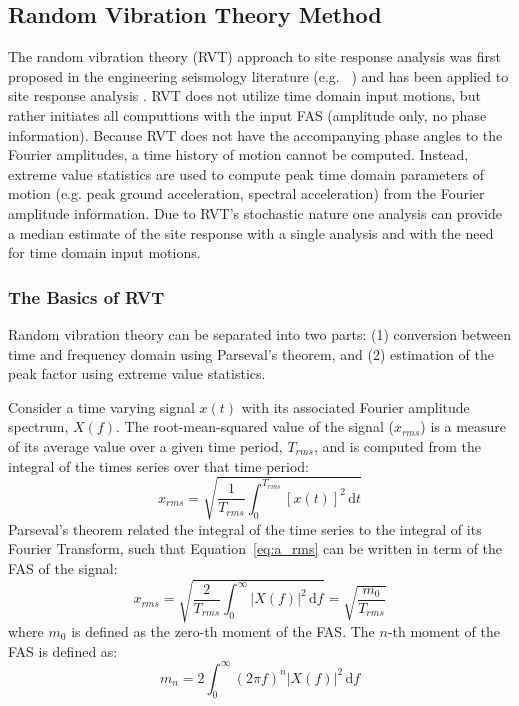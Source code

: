 \documentclass[12pt,oneside]{book}
\newcommand{\ud}{\,\mathrm{d}}
\begin{document}
\subsection{Random Vibration Theory Method}\label{ch:sra:methods:rvt}
The random vibration theory (RVT) approach to site response analysis was first proposed in the
engineering seismology literature (e.g. ~\citet{schneider:91}) and has been applied to site response
analysis \citep{silva:97,rathje:05}. RVT does not utilize time domain input motions, but rather
initiates all computtions with the input FAS (amplitude only, no phase information).  Because RVT
does not have the accompanying phase angles to the Fourier amplitudes, a time history of motion
cannot be computed.  Instead, extreme value statistics are used to compute peak time domain
parameters of motion (e.g. peak ground acceleration, spectral acceleration) from the Fourier
amplitude information. Due to RVT's stochastic nature one analysis can provide a median estimate of
the site response with a single analysis and with the need for time domain input motions.

\subsubsection{The Basics of RVT}
Random vibration theory can be separated into two parts: (1) conversion between time and frequency
domain using Parseval's theorem, and (2) estimation of the peak factor using extreme value
statistics.

Consider a time varying signal $x(t)$ with its associated Fourier amplitude spectrum, $X(f)$.  The
root-mean-squared value of the signal ($x_{rms}$) is a measure of its average value over a given
time period, $T_{rms}$, and is computed from the integral of the times series over that time period:
\begin{equation}
    x_{rms} = \sqrt{ \frac{1}{T_{rms}} \int_0^{T_{rms}} \left[ x(t) \right]^2 \ud t }
    \label{eq:a_rms}
\end{equation}
Parseval's theorem related the integral of the time series to the integral of its Fourier Transform,
such that Equation~\ref{eq:a_rms} can be written in term of the FAS of the signal:
\begin{equation}
    x_{rms} = \sqrt{ \frac{2}{T_{rms}} \int_0^{\infty} |X(f)|^2 \ud f } = \sqrt{\frac{m_0}{T_{rms}}}
    \label{eq:rvt:rms}
\end{equation}
where $m_0$ is defined as the zero-th moment of the FAS.  The $n$-th moment of the FAS is defined
as:
\begin{equation}
    m_n = 2 \int_0^{\infty} \left( 2 \pi f \right)^n |X(f)|^2 \ud f
    \label{eq:rvt:moments}
\end{equation}
\end{document}

